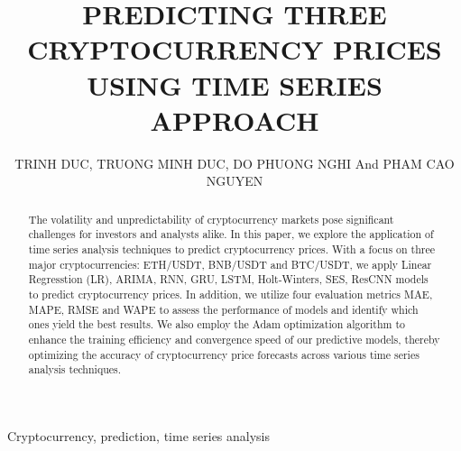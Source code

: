 \documentclass{ieeeojies}
\begin{document}
\title{PREDICTING THREE CRYPTOCURRENCY PRICES USING TIME SERIES APPROACH}

\author
{\uppercase{TRINH DUC},
\uppercase{TRUONG MINH DUC},
\uppercase {DO PHUONG NGHI}
\uppercase and {PHAM CAO NGUYEN}}

\address[1]{Faculty of Information Systems, University of Information Technology, (e-mail: 21521969@gm.uit.edu.vn)}
\address[2]{Faculty of Information Systems, University of Information Technology, (e-mail: 21521971@gm.uit.edu.vn)}
\address[3]{Faculty of Information Systems, University of Information Technology, (e-mail: 21522372@gm.uit.edu.vn)}
\address[3]{Faculty of Information Systems, University of Information Technology, (e-mail: 21522395@gm.uit.edu.vn)}

\begin{abstract}
The volatility and unpredictability of cryptocurrency markets pose significant challenges for investors and analysts alike. In this paper, we explore the application of time series analysis techniques to predict cryptocurrency prices. With a focus on three major cryptocurrencies: ETH/USDT, BNB/USDT and BTC/USDT, we apply Linear Regresstion (LR), ARIMA, RNN, GRU, LSTM, Holt-Winters, SES, ResCNN models to predict cryptocurrency prices. In addition, we utilize four evaluation metrics MAE, MAPE, RMSE and WAPE to assess the performance of models and identify which ones yield the best results. We also employ the Adam optimization algorithm to enhance the training efficiency and convergence speed of our predictive models, thereby optimizing the accuracy of cryptocurrency price forecasts across various time series analysis techniques.
\end{abstract}

\begin{keywords}
Cryptocurrency, prediction, time series analysis
\end{keywords}

\titlepgskip=-15pt

\maketitle
\end{document}

